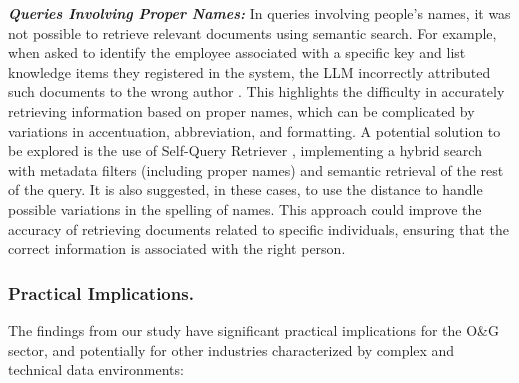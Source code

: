                 
                \textbf{\textit{Queries Involving Proper Names:}}
                    In queries involving people's names, it was not possible to retrieve relevant documents using semantic search. 
                    For example, when asked to identify the employee associated with a specific key and list knowledge items they registered in the system, the LLM incorrectly attributed such documents to the wrong author
                    . 
                    This highlights the difficulty in accurately retrieving information based on proper names, which can be complicated by variations in accentuation, abbreviation, and formatting.
                    A potential solution to be explored is the use of Self-Query Retriever \citep{LangchainSelfQuery2023}, implementing a hybrid search with metadata filters (including proper names) and semantic retrieval of the rest of the query. 
                    It is also suggested, in these cases, to use the \citep{Levenshtein1966} distance to handle possible variations in the spelling of names. 
                    This approach could improve the accuracy of retrieving documents related to specific individuals, ensuring that the correct information is associated with the right person.
                    
            
            \subsubsection{Practical Implications.} 

                The findings from our study have significant practical implications for the O\&G sector, and potentially for other industries characterized by complex and technical data environments:
                    
